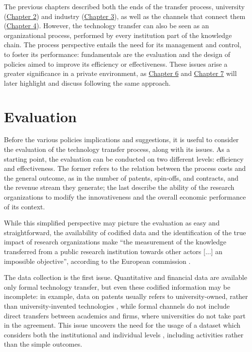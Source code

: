 

\label{Chapter5} %

The previous chapters described both the ends of the transfer process, university (\hyperref[Chapter2]{Chapter 2}) and industry (\hyperref[Chapter3]{Chapter 3}), as well as the channels that connect them (\hyperref[Chapter4]{Chapter 4}). However, the technology transfer can also be seen as an organizational process, performed by every institution part of the knowledge chain. The process perspective entails the need for its management and control, to foster its performance: fundamentals are the evaluation and the design of policies aimed to improve its efficiency or effectiveness. These issues arise a greater significance in a private environment, as \hyperref[Chapter6]{Chapter 6} and \hyperref[Chapter7]{Chapter 7} will later highlight and discuss following the same approach.

\section{Evaluation}

Before the various policies implications and suggestions, it is useful to consider the evaluation of the technology transfer process, along with its issues. As a starting point, the evaluation can be conducted on two different levels: efficiency and effectiveness. The former refers to the relation between the process costs and the general outcome, as in the number of patents, spin-offs, and contracts, and the revenue stream they generate; the last describe the ability of the research organizations to modify the innovativeness and the overall economic performance of its context. 

While this simplified perspective may picture the evaluation as easy and straightforward, the availability of codified data and the identification of the true impact of research organizations make \enquote{the measurement of the knowledge transferred from a public research institution towards other actors [...] an impossible objective}, according to the European commission \citep{Balderi2010}. 

The data collection is the first issue. Quantitative and financial data are available only formal technology transfer, but even these codified information may be incomplete: in example, data on patents usually refers to university-owned, rather than university-invented technologies \citep{Geuna2009}, while formal channels do not include direct transfers between academics and firms, where universities do not take part in the agreement. This issue uncovers the need for the usage of a dataset which considers both the institutional and individual levels \citep{Wong2010}, including activities rather than the simple outcomes. 

